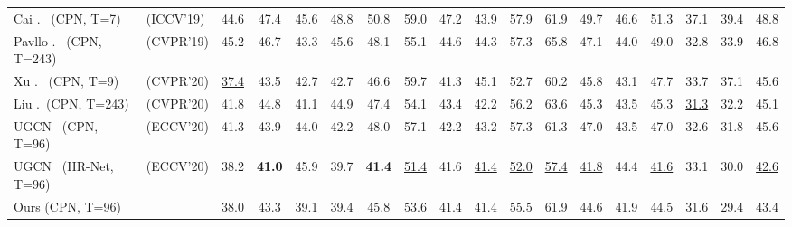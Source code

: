 \documentclass[sigconf]{acmart}
\begin{document}
\begin{table*}[t]
{\begin{tabular}{@{}ll|ccccccccccccccc|c@{}}
			Cai \etal.~\cite{cai2019exploiting} (CPN, T=7) & (ICCV'19) &       44.6       &       47.4       &       45.6       &       48.8       &       50.8       &       59.0       &       47.2       &       43.9       &       57.9       &       61.9       &       49.7       &       46.6       &       51.3       &       37.1       &       39.4       &       48.8       \\
			Pavllo \etal.~\cite{pavllo20193d} (CPN, T=243) & (CVPR'19) &       45.2       &       46.7       &       43.3       &       45.6       &       48.1       &       55.1       &       44.6       &       44.3       &       57.3       &       65.8       &       47.1       &       44.0       &       49.0       &       32.8       &       33.9       &       46.8       \\
			Xu \etal.~\cite{xu2020deep} (CPN, T=9)         & (CVPR'20) & \underline{37.4} &      {43.5}      &       42.7       &      {42.7}      &      {46.6}      &       59.7       &      {41.3}      &       45.1       &      {52.7}      &      {60.2}      &       45.8       &      {43.1}      &       47.7       &       33.7       &       37.1       &       45.6       \\
			Liu \etal.~\cite{liu2020attention}(CPN, T=243) & (CVPR'20) &       41.8       &       44.8       &       41.1       &       44.9       &       47.4       &       54.1       &       43.4       &       42.2       &       56.2       &       63.6       &       45.3       &       43.5       &       45.3       & \underline{31.3} &       32.2       &       45.1       \\
			UGCN~\cite{wang2020motion} (CPN, T=96)         & (ECCV'20) &       41.3       &       43.9       &       44.0       &       42.2       &       48.0       &       57.1       &       42.2       &       43.2       &       57.3       &       61.3       &       47.0       &       43.5       &       47.0       &       32.6       &       31.8       &       45.6       \\
			UGCN~\cite{wang2020motion} (HR-Net, T=96)      & (ECCV'20) &      {38.2}      &  \textbf{41.0}   &      {45.9}      &      {39.7}      &  \textbf{41.4}   & \underline{51.4} &      {41.6}      & \underline{41.4} & \underline{52.0} & \underline{57.4} & \underline{41.8} &      {44.4}      & \underline{41.6} &      {33.1}      &      {30.0}      & \underline{42.6} \\ \midrule[0.5pt]
			Ours (CPN, T=96)                               &           &       38.0       &       43.3       & \underline{39.1} & \underline{39.4} &       45.8       &       53.6       & \underline{41.4} & \underline{41.4} &       55.5       &       61.9       &       44.6       & \underline{41.9} &       44.5       &       31.6       & \underline{29.4} &       43.4       \\

\end{tabular}}
\end{table*}
\end{document}
